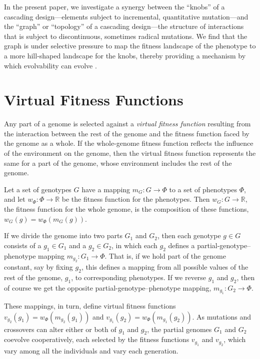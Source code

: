 \documentclass[letterpaper]{article}
\begin{document}
In the present paper, we investigate a synergy between the ``knobs'' of a
cascading design---elements subject to incremental, quantitative mutation---and
the ``graph'' or ``topology'' of a cascading design---the structure of
interactions that is subject to discontinuous, sometimes radical mutations.
We find that the graph is under selective pressure to map the fitness landscape
of the phenotype to a more hill-shaped landscape for the knobs, thereby
providing a mechanism by which evolvability can evolve
\citep{colegrave2008experimental}.

\section{Virtual Fitness Functions}

Any part of a genome is selected against a \textit{virtual fitness function}
resulting from the interaction between the rest of the genome and the fitness
function faced by the genome as a whole. If the whole-genome fitness function
reflects the influence of the environment on the genome, then the virtual
fitness function represents the same for a part of the genome, whose
environment includes the rest of the genome.

Let a set of genotypes $G$ have a mapping $m_{G} : G \rightarrow \Phi$ to a set
of phenotypes $\Phi$, and let $w_\Phi : \Phi \rightarrow \mathbb{R}$ be the
fitness function for the phenotypes. Then $w_G : G \rightarrow \mathbb{R}$, the
fitness function for the whole genome, is the composition of these functions,
$w_G(g) = w_\Phi(m_{G}(g))$.

If we divide the genome into two parts $G_1$ and $G_2$, then each genotype $g
\in G$ consists of a $g_1 \in G_1$ and a $g_2 \in G_2$, in which each $g_2$
defines a partial-genotype--phenotype mapping $m_{g_2} : G_1 \rightarrow
\Phi$. That is, if we hold part of the genome constant, say by fixing $g_2$,
this defines a mapping from all possible values of the rest of the genome,
$g_1$, to corresponding phenotypes. If we reverse $g_1$ and $g_2$, then of
course we get the opposite partial-genotype--phenotype mapping, $m_{g_1} : G_2
\rightarrow \Phi$.

These mappings, in turn, define virtual fitness functions $v_{g_2}(g_1) =
w_\Phi(m_{g_2}(g_1))$ and $v_{g_1}(g_2) = w_\Phi(m_{g_1}(g_2))$. As mutations
and crossovers can alter either or both of $g_1$ and $g_2$, the partial
genomes $G_1$ and $G_2$ coevolve cooperatively, each selected by
the fitness functions $v_{g_1}$ and $v_{g_2}$, which vary among all the
individuals and vary each generation.
\end{document}
